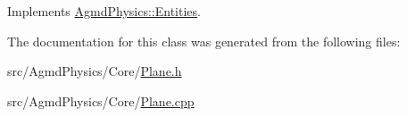 Implements \hyperlink{class_agmd_physics_1_1_entities_af050c30f7d9d0f0d0c8c626b6bbf30d1}{Agmd\+Physics\+::\+Entities}.



The documentation for this class was generated from the following files\+:\begin{DoxyCompactItemize}
\item 
src/\+Agmd\+Physics/\+Core/\hyperlink{_agmd_physics_2_core_2_plane_8h}{Plane.\+h}\item 
src/\+Agmd\+Physics/\+Core/\hyperlink{_plane_8cpp}{Plane.\+cpp}\end{DoxyCompactItemize}
